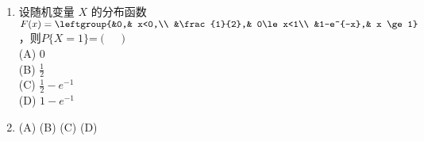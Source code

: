 \begin{enumerate}
(D) $\pmat{-1& & & \\ &-1& & &\\ & &-1& \\& & &0}$
\item  设随机变量 $X$ 的分布函数 $F(x)=\leftgroup{&0,& x<0,\\ &\frac{1}{2},& 0\le x<1\\ &1-e^{-x},& x \ge 1}$   ，则$P\{X=1\}$=$(\quad )$\\
(A)  $0$\\
(B) $\frac{1}{2}$\\
(C)  $\frac{1}{2}-e^{-1}$\\
(D) $1-e^{-1}$
\item  
(A) 
(B)
(C)
(D)

\end{enumerate}